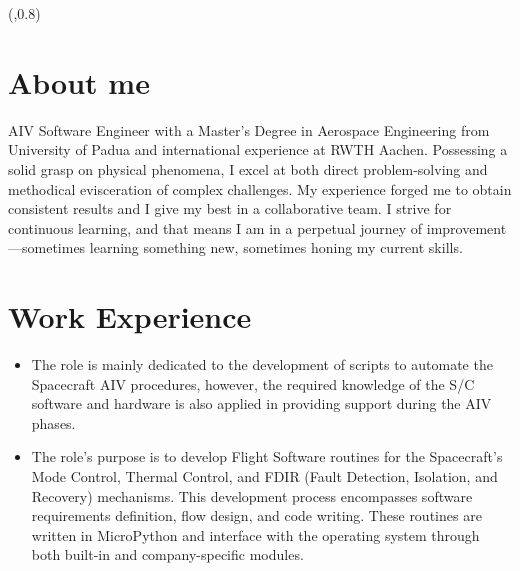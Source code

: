 \documentclass[a4paper, 12pt]{my_cv}
\newlength\MyColWidth
\newlength\MyTopMargin
\newlength\MainWidth
\begin{document}
\TPMargin{5mm}
\begin{textblock*}{\MainWidth}(\MyColWidth,0.8\MyTopMargin){
    
    
    
    }
        
    \section{About me}
      AIV Software Engineer with a Master's Degree in Aerospace Engineering from University of Padua and international experience at RWTH Aachen. Possessing a solid grasp on physical phenomena, I excel at both direct problem-solving and methodical evisceration of complex challenges. My experience forged me to obtain consistent results and I give my best in a collaborative team. I strive for continuous learning, and that means I am in a perpetual journey of improvement—sometimes learning something new, sometimes honing my current skills.

    \section{Work Experience}
    \begin{itemize}
        \item {}
    
    The role is mainly dedicated to the development of scripts to automate the Spacecraft AIV procedures, however, the required knowledge of the S/C software and hardware is also applied in providing support during the AIV phases.
    
        \item {}
    
    The role's purpose is to develop Flight Software routines for the Spacecraft's Mode Control, Thermal Control, and FDIR (Fault Detection, Isolation, and Recovery) mechanisms. This development process encompasses software requirements definition, flow design, and code writing. These routines are written in MicroPython and interface with the operating system through both built-in and company-specific modules.
    \end{itemize}
    

\end{textblock*}
\end{document}
